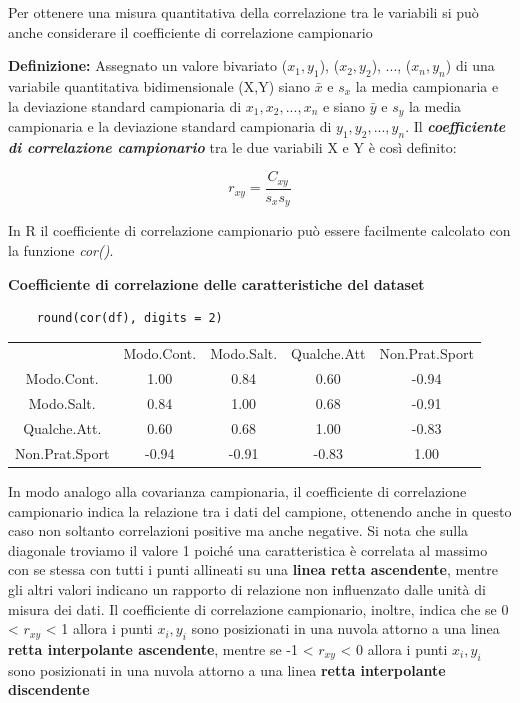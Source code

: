 Per ottenere una misura quantitativa della correlazione tra le variabili si può anche considerare il coefficiente di correlazione campionario 

\noindent \textbf{Definizione:} Assegnato un valore bivariato ($x_1, y_1$), ($x_2, y_2$), ..., ($x_n, y_n$) di una variabile quantitativa bidimensionale (X,Y) siano $\bar x$ e $s_x$ la media campionaria e la deviazione standard campionaria di $x_1, x_2, ..., x_n$ e siano $\bar y$ e $s_y$  la media campionaria e la deviazione standard campionaria di $y_1, y_2, ..., y_n$. Il \textbf{\textit{coefficiente di correlazione campionario}} tra le due variabili X e Y è così definito:

\[r_{xy} = \frac{C_{xy}}{s_{x} s_{y}}\]

In R il coefficiente di correlazione campionario può essere facilmente calcolato con la funzione \textit{cor()}.

\noindent \textbf{Coefficiente di correlazione delle caratteristiche del dataset}

\vspace{5mm}
\begin{lstlisting}
    round(cor(df), digits = 2)
\end{lstlisting}
\vspace{5mm}

\vspace{5mm}
\begin{tabular}{c c c c c}
 & Modo.Cont. & Modo.Salt. & Qualche.Att & Non.Prat.Sport\\
 Modo.Cont. & 1.00 & 0.84 & 0.60 & -0.94\\
 Modo.Salt. & 0.84 & 1.00 & 0.68 & -0.91\\
 Qualche.Att. & 0.60 & 0.68 & 1.00 & -0.83\\
 Non.Prat.Sport & -0.94 & -0.91 & -0.83 & 1.00\\
\end{tabular}
\vspace{5mm}

In modo analogo alla covarianza campionaria, il coefficiente di correlazione campionario indica la relazione tra i dati del campione, ottenendo anche in questo caso non soltanto correlazioni positive ma anche negative. Si nota che sulla diagonale troviamo il valore 1 poiché una caratteristica è correlata al massimo con se stessa con tutti i punti allineati su una \textbf{linea retta ascendente}, mentre gli altri valori indicano un rapporto di relazione non influenzato dalle unità di misura dei dati. Il coefficiente di correlazione campionario, inoltre, indica che se 0 < $r_{xy}$ < 1 allora i punti $x_i, y_i$ sono posizionati in una nuvola attorno a una linea \textbf{retta interpolante ascendente}, mentre se -1 < $r_{xy}$ < 0 allora i punti $x_i, y_i$ sono posizionati in una nuvola attorno a una linea \textbf{retta interpolante discendente}

